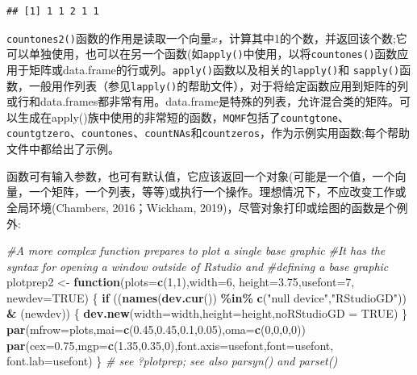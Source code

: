 \documentclass[
  lang=cn,
  11pt,
  scheme=chinese,
  chinesefont=nofont,
  citestyle=gb7714-2015,
  bibstyle=gb7714-2015]{elegantbook}
\newenvironment{Shaded}{\begin{snugshade}}{\end{snugshade}}
\newcommand{\AttributeTok}[1]{\textcolor[rgb]{0.13,0.29,0.53}{#1}}
\newcommand{\CommentTok}[1]{\textcolor[rgb]{0.56,0.35,0.01}{\textit{#1}}}
\newcommand{\ConstantTok}[1]{\textcolor[rgb]{0.56,0.35,0.01}{#1}}
\newcommand{\ControlFlowTok}[1]{\textcolor[rgb]{0.13,0.29,0.53}{\textbf{#1}}}
\newcommand{\DecValTok}[1]{\textcolor[rgb]{0.00,0.00,0.81}{#1}}
\newcommand{\FloatTok}[1]{\textcolor[rgb]{0.00,0.00,0.81}{#1}}
\newcommand{\FunctionTok}[1]{\textcolor[rgb]{0.13,0.29,0.53}{\textbf{#1}}}
\newcommand{\NormalTok}[1]{#1}
\newcommand{\OtherTok}[1]{\textcolor[rgb]{0.56,0.35,0.01}{#1}}
\newcommand{\SpecialCharTok}[1]{\textcolor[rgb]{0.81,0.36,0.00}{\textbf{#1}}}
\newcommand{\StringTok}[1]{\textcolor[rgb]{0.31,0.60,0.02}{#1}}
\begin{document}
\begin{verbatim}
## [1] 1 1 2 1 1
\end{verbatim}

\texttt{countones2()}函数的作用是读取一个向量\(x\)，计算其中1的个数，并返回该个数;它可以单独使用，也可以在另一个函数(如\texttt{apply()}中使用，以将\texttt{countones()}函数应用于矩阵或data.frame的行或列。\texttt{apply()}函数以及相关的\texttt{lapply()}和 \texttt{sapply()}函数，一般用作列表（参见\texttt{lapply()}的帮助文件），对于将给定函数应用到矩阵的列或行和data.frames都非常有用。data.frame是特殊的列表，允许混合类的矩阵。可以生成在apply()族中使用的非常短的函数，\texttt{MQMF}包括了\texttt{countgtone}、\texttt{countgtzero}、\texttt{countones}、\texttt{countNAs}和\texttt{countzeros}，作为示例实用函数;每个帮助文件中都给出了示例。

函数可有输入参数，也可有默认值，它应该返回一个对象(可能是一个值，一个向量，一个矩阵，一个列表，等等)或执行一个操作。理想情况下，不应改变工作或全局环境(Chambers, 2016；Wickham, 2019)，尽管对象打印或绘图的函数是个例外:

\begin{Shaded}
\begin{Highlighting}[]
 \CommentTok{\#A more complex function prepares to plot a single base graphic  }
 \CommentTok{\#It has the syntax for opening a window outside of Rstudio and   }
 \CommentTok{\#defining a base graphic  }
\NormalTok{plotprep2 }\OtherTok{\textless{}{-}} \ControlFlowTok{function}\NormalTok{(}\AttributeTok{plots=}\FunctionTok{c}\NormalTok{(}\DecValTok{1}\NormalTok{,}\DecValTok{1}\NormalTok{),}\AttributeTok{width=}\DecValTok{6}\NormalTok{, }\AttributeTok{height=}\FloatTok{3.75}\NormalTok{,}\AttributeTok{usefont=}\DecValTok{7}\NormalTok{,   }
                      \AttributeTok{newdev=}\ConstantTok{TRUE}\NormalTok{) \{  }
  \ControlFlowTok{if}\NormalTok{ ((}\FunctionTok{names}\NormalTok{(}\FunctionTok{dev.cur}\NormalTok{()) }\SpecialCharTok{\%in\%} \FunctionTok{c}\NormalTok{(}\StringTok{"null device"}\NormalTok{,}\StringTok{"RStudioGD"}\NormalTok{)) }\SpecialCharTok{\&}   
\NormalTok{      (newdev)) \{  }
     \FunctionTok{dev.new}\NormalTok{(}\AttributeTok{width=}\NormalTok{width,}\AttributeTok{height=}\NormalTok{height,}\AttributeTok{noRStudioGD =} \ConstantTok{TRUE}\NormalTok{)  }
\NormalTok{  \}  }
  \FunctionTok{par}\NormalTok{(}\AttributeTok{mfrow=}\NormalTok{plots,}\AttributeTok{mai=}\FunctionTok{c}\NormalTok{(}\FloatTok{0.45}\NormalTok{,}\FloatTok{0.45}\NormalTok{,}\FloatTok{0.1}\NormalTok{,}\FloatTok{0.05}\NormalTok{),}\AttributeTok{oma=}\FunctionTok{c}\NormalTok{(}\DecValTok{0}\NormalTok{,}\DecValTok{0}\NormalTok{,}\DecValTok{0}\NormalTok{,}\DecValTok{0}\NormalTok{))  }
  \FunctionTok{par}\NormalTok{(}\AttributeTok{cex=}\FloatTok{0.75}\NormalTok{,}\AttributeTok{mgp=}\FunctionTok{c}\NormalTok{(}\FloatTok{1.35}\NormalTok{,}\FloatTok{0.35}\NormalTok{,}\DecValTok{0}\NormalTok{),}\AttributeTok{font.axis=}\NormalTok{usefont,}\AttributeTok{font=}\NormalTok{usefont,   }
      \AttributeTok{font.lab=}\NormalTok{usefont)  }
\NormalTok{\}  }\CommentTok{\#  see ?plotprep; see also parsyn() and parset()  }
\end{Highlighting}
\end{Shaded}
\end{document}
